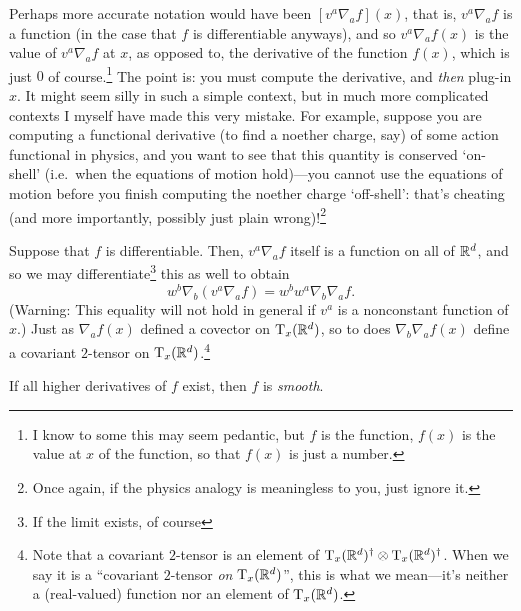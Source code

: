 \begin{dfn}
\begin{savenotes}
\begin{rmk}
Perhaps more accurate notation would have been $[v^a\nabla _af](x)$, that is, $v^a\nabla _af$ is a function (in the case that $f$ is differentiable anyways), and so $v^a\nabla _af(x)$ is the value of $v^a\nabla _af$ at $x$, as opposed to, the derivative of the function $f(x)$, which is just $0$ of course.\footnote{I know to some this may seem pedantic, but $f$ is the function, $f(x)$ is the value at $x$ of the function, so that $f(x)$ is just a number.}  The point is:  you must compute the derivative, and \emph{then} plug-in $x$.  It might seem silly in such a simple context, but in much more complicated contexts I myself have made this very mistake.  For example, suppose you are computing a functional derivative (to find a noether charge, say) of some action functional in physics, and you want to see that this quantity is conserved `on-shell' (i.e.~when the equations of motion hold)---you cannot use the equations of motion before you finish computing the noether charge `off-shell':  that's cheating (and more importantly, possibly just plain wrong)!\footnote{Once again, if the physics analogy is meaningless to you, just ignore it.}
\end{rmk}
\begin{rmk}
Suppose that $f$ is differentiable.  Then, $v^a\nabla _af$ itself is a function on all of $\R ^d$, and so we may differentiate\footnote{If the limit exists, of course} this as well to obtain
\begin{equation}
w^b\nabla _b(v^a\nabla _af)=w^bw^a\nabla _b\nabla _af.
\end{equation}
(Warning:  This equality will not hold in general if $v^a$ is a nonconstant function of $x$.)  Just as $\nabla _af(x)$ defined a covector on $\tangent{\R ^d}{x}$, so to does $\nabla _b\nabla _af(x)$ define a covariant $2$-tensor on $\tangent{\R ^d}{x}$.\footnote{Note that a covariant $2$-tensor is an element of $\tangent{\R ^d}{x}^\dagger \otimes \tangent{\R ^d}{x}^\dagger$.  When we say it is a ``covariant $2$-tensor \emph{on} $\tangent{\R ^d}{x}$'', this is what we mean---it's neither a (real-valued) function nor an element of $\tangent{\R ^d}{x}$.}
\end{rmk}
\begin{rmk}
If all higher derivatives of $f$ exist, then $f$ is \emph{smooth}.
\end{rmk}
\begin{rmk}

\end{rmk}
\end{savenotes}
\end{dfn}
